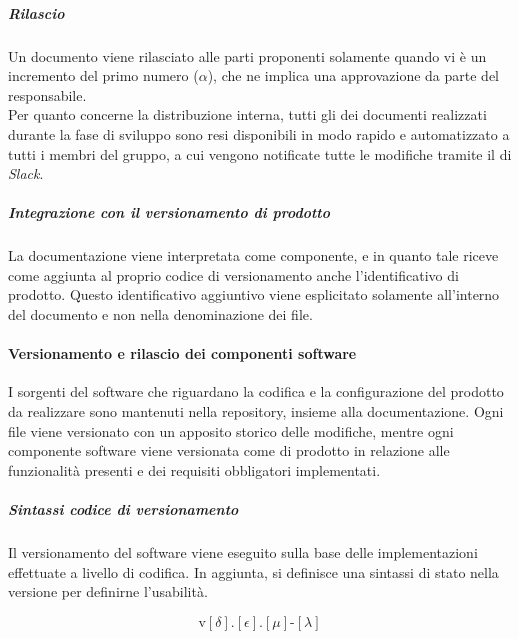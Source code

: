 		\subparagraph{Rilascio}

		Un documento viene rilasciato alle parti proponenti solamente quando vi è un incremento del primo numero (\(\alpha\)), che ne implica una approvazione da parte del responsabile. \\
		Per quanto concerne la distribuzione interna, tutti gli  dei documenti realizzati durante la fase di sviluppo sono resi disponibili in modo rapido e automatizzato a tutti i membri del gruppo, a cui vengono notificate tutte le modifiche tramite il  di \textit{Slack}.

		\subparagraph{Integrazione con il versionamento di prodotto}

		La documentazione viene interpretata come componente, e in quanto tale riceve come aggiunta al proprio codice di versionamento anche l'identificativo di prodotto. Questo identificativo aggiuntivo viene esplicitato solamente all'interno del documento e non nella denominazione dei file.

	\paragraph{Versionamento e rilascio dei componenti software}

	I sorgenti del software che riguardano la codifica e la configurazione del prodotto da realizzare sono mantenuti nella repository, insieme alla documentazione. Ogni file viene versionato con un apposito storico delle modifiche, mentre ogni componente software viene versionata come  di prodotto in relazione alle funzionalità presenti e dei requisiti obbligatori implementati.

		\subparagraph{Sintassi codice di versionamento}

		Il versionamento del software viene eseguito sulla base delle implementazioni effettuate a livello di codifica.
		In aggiunta, si definisce una sintassi di stato nella versione per definirne l'usabilità.

		\[%
			\text{v}[\delta].[\epsilon].[\mu]\text{-}[\lambda]
		\]

